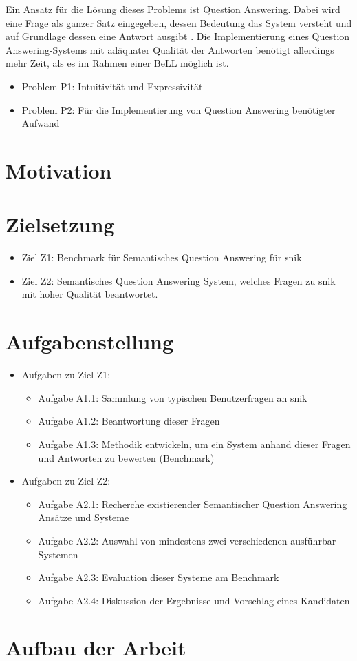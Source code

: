 Ein Ansatz für die Lösung dieses Problems ist Question Answering.
Dabei wird eine Frage als ganzer Satz eingegeben, dessen Bedeutung das System versteht und auf Grundlage dessen eine Antwort ausgibt \citep{qadefinition}.
Die Implementierung eines Question Answering-Systems mit adäquater Qualität der Antworten benötigt allerdings mehr Zeit, als es im Rahmen einer BeLL möglich ist.

\begin{itemize}
	\item Problem P1: Intuitivität und Expressivität
	\item Problem P2: Für die Implementierung von Question Answering benötigter Aufwand
\end{itemize}


\section{Motivation}


\section{Zielsetzung}\label{sec:zielsetzung}
	\begin{itemize}
		\item Ziel Z1: Benchmark für Semantisches Question Answering für \ac{snik}
		\item Ziel Z2: Semantisches Question Answering System, welches Fragen zu \ac{snik} mit hoher Qualität beantwortet.
	\end{itemize}
\section{Aufgabenstellung}

\begin{itemize}
	\item Aufgaben zu Ziel Z1:
	\begin{itemize}
		\item Aufgabe A1.1: Sammlung von typischen Benutzerfragen an \ac{snik}
		\item Aufgabe A1.2: Beantwortung dieser Fragen
		\item Aufgabe A1.3: Methodik entwickeln, um ein System anhand dieser Fragen und Antworten zu bewerten (Benchmark)
	\end{itemize}
	\item Aufgaben zu Ziel Z2:
	\begin{itemize}
		\item Aufgabe A2.1: Recherche existierender Semantischer Question Answering Ansätze und Systeme
		\item Aufgabe A2.2: Auswahl von mindestens zwei verschiedenen ausführbar Systemen
		\item Aufgabe A2.3: Evaluation dieser Systeme am Benchmark
		\item Aufgabe A2.4: Diskussion der Ergebnisse und Vorschlag eines Kandidaten
	\end{itemize}
\end{itemize}

\section{Aufbau der Arbeit}
